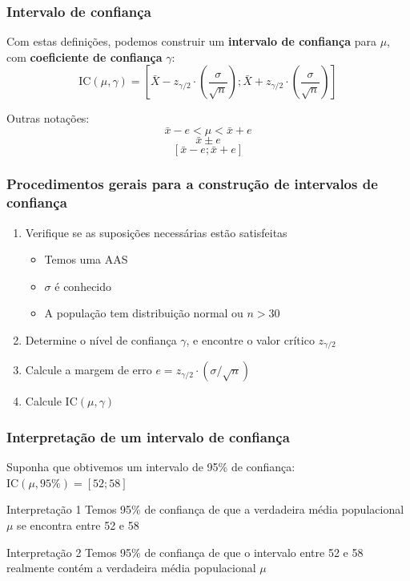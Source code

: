 \documentclass[11pt]{beamer}
\begin{document}
\begin{frame}
\frametitle{Intervalo de confiança}

Com estas definições, podemos construir um \textbf{intervalo de
confiança} para \(\mu\), com \textbf{coeficiente de confiança}
\(\gamma\): \[
\text{IC}(\mu, \gamma) = \left[ \bar{X} - z_{\gamma/2} \cdot
  \left(\frac{\sigma}{\sqrt{n}}\right) ; \bar{X} + z_{\gamma/2} \cdot
  \left(\frac{\sigma}{\sqrt{n}}\right)  \right]
\]

Outras notações: \[\bar{x} - e < \mu < \bar{x} + e\] \[\bar{x} \pm e\]
\[[\bar{x} - e; \bar{x} + e]\]
\end{frame}

\begin{frame}
\frametitle{Procedimentos gerais para a construção de intervalos de confiança}

\begin{enumerate}
\def\labelenumi{\arabic{enumi}.}
\item
  Verifique se as suposições necessárias estão satisfeitas

  \begin{itemize}
  \item
    Temos uma AAS
  \item
    \(\sigma\) é conhecido
  \item
    A população tem distribuição normal ou \(n>30\)
  \end{itemize}
\item
  Determine o nível de confiança \(\gamma\), e encontre o valor crítico
  \(z_{\gamma/2}\)
\item
  Calcule a margem de erro \(e = z_{\gamma/2} \cdot (\sigma/\sqrt{n})\)
\item
  Calcule \(\text{IC}(\mu, \gamma)\)
\end{enumerate}
\end{frame}

\begin{frame}
\frametitle{Interpretação de um intervalo de confiança}

Suponha que obtivemos um intervalo de 95\% de confiança:
\(\text{IC}(\mu,95\%) = [52; 58]\)

\begin{block}{Interpretação 1}
Temos 95\% de confiança de que a verdadeira média populacional $\mu$
se encontra entre 52 e 58
\end{block}
\begin{block}{Interpretação 2}
Temos 95\% de confiança de que o intervalo entre 52 e 58 realmente
contém a verdadeira média populacional $\mu$
\end{block}
\end{frame}
\end{document}
